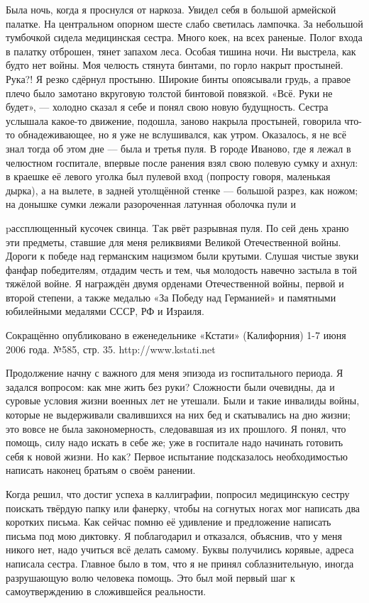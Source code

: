 \label{13-1}
Была ночь, когда я проснулся от наркоза. Увидел себя в большой армейской палатке. На центральном опорном шесте слабо светилась лампочка. За небольшой тумбочкой сидела медицинская сестра. Много коек, на всех раненые. Полог входа в палатку отброшен, тянет запахом леса. Особая тишина ночи. Ни выстрела, как будто нет войны. Моя челюсть стянута бинтами, по горло накрыт простыней. Рука?! Я резко сдёрнул простыню. Широкие бинты опоясывали грудь, а правое плечо было замотано вкруговую толстой бинтовой повязкой. «Всё. Руки не будет», — холодно сказал я себе и понял свою новую будущность. Сестра услышала какое-то движение, подошла, заново накрыла простыней, говорила что-то обнадеживающее, но я уже не вслушивался, как утром. Оказалось, я не всё знал тогда об этом дне — была и третья пуля. В городе Иваново, где я лежал в челюстном госпитале, впервые после ранения взял свою полевую сумку и ахнул: в краешке её левого уголка был пулевой вход (попросту говоря, маленькая дырка), а на вылете, в задней утолщённой стенке — большой разрез, как ножом; на донышке сумки лежали разороченная латунная оболочка пули и

\label{14-1}
pассплющенный кусочек свинца. Tак рвёт разрывная пуля. По сей день храню эти предметы, ставшие для меня реликвиями Великой Отечественной войны. Дороги к победе над германским нацизмом были крутыми. Слушая чистые звуки фанфар победителям, отдадим честь и тем, чья молодость навечно застыла в той тяжёлой войне. Я награждён двумя орденами Отечественной войны, первой и второй степени, а также медалью «За Победу над Германией» и памятными юбилейными медалями СССР, РФ и Израиля.

\label{14-2}
Сокращённо опубликовано в еженедельнике «Кстати» (Калифорния) 1-7 июня 2006 года. №585, стр. 35. http://www.kstati.net

\label{14-3}
Продолжение начну с важного для меня эпизода из госпитального периода. Я задался вопросом: как мне жить без руки? Сложности были очевидны, да и суровые условия жизни военных лет не утешали. Были и такие инвалиды войны, которые не выдерживали свалившихся на них бед и скатывались на дно жизни; это вовсе не была закономерность, следовавшая из их прошлого. Я понял, что помощь, силу надо искать в себе же; уже в госпитале надо начинать готовить себя к новой жизни. Но как? 
Первое испытание подсказалось необходимостью написать наконец братьям о своём ранении.

\label{15-1}
 Когда решил, что достиг успеха в каллиграфии, попросил медицинскую сестру поискать твёрдую папку или фанерку, чтобы на согнутых ногах мог написать два коротких письма. Как сейчас помню её удивление и предложение написать письма под мою диктовку. Я поблагодарил и отказался, объяснив, что у меня никого нет, надо учиться всё делать самому. 
 Буквы получились корявые, адреса написала сестра. Главное было в том, что я не принял соблазнительную, иногда разрушающую волю человека помощь. Это был мой первый шаг к самоутверждению в сложившейся реальности.
